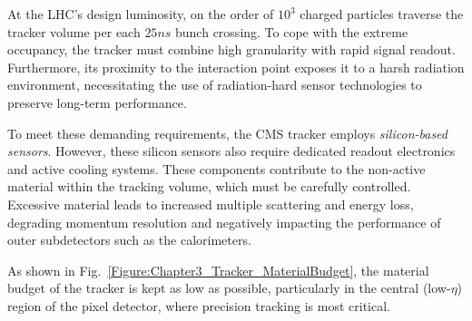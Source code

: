 At the LHC’s design luminosity, on the order of $10^3$ charged particles traverse the tracker volume per each $25\unit{ns}$ bunch crossing. To cope with the extreme occupancy, the tracker must combine high granularity with rapid signal readout. Furthermore, its proximity to the interaction point exposes it to a harsh radiation environment, necessitating the use of radiation-hard sensor technologies to preserve long-term performance.

To meet these demanding requirements, the CMS tracker employs \textit{silicon-based sensors}. However, these silicon sensors also require dedicated readout electronics and active cooling systems. These components contribute to the non-active material within the tracking volume, which must be carefully controlled. Excessive material leads to increased multiple scattering and energy loss, degrading momentum resolution and negatively impacting the performance of outer subdetectors such as the calorimeters.

As shown in Fig.~\ref{Figure:Chapter3_Tracker_MaterialBudget}, the material budget of the tracker is kept as low as possible, particularly in the central (low-$\eta$) region of the pixel detector, where precision tracking is most critical.

